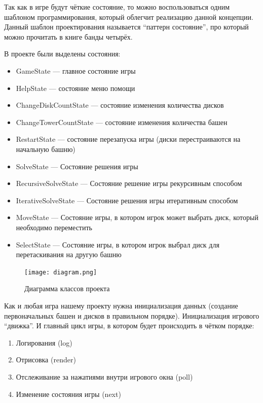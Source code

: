 Так как в игре будут чёткие состояние, то можно воспользоваться одним шаблоном
программирования, который облегчит реализацию данной концепции. Данный шаблон
проектирования называется ``паттерн состояние'', про который можно прочитать в
книге банды четырёх.\cite{book:2584808}

В проекте были выделены состояния:

\begin{itemize}
	\item GameState --- главное состояние игры
	\item HelpState --- состояние меню помощи
	\item ChangeDiskCountState --- состояние изменения количества дисков
	\item ChangeTowerCountState --- состояние изменения количества башен
	\item RestartState --- состояние перезапуска игры (диски перестраиваются на
	      начальную башню)
	\item SolveState --- Состояние решения игры
	\item RecursiveSolveState --- Состояние решение игры рекурсивным способом
	\item IterativeSolveState --- Состояние решения игры итеративным способом
	\item MoveState --- Состояние игры, в котором игрок может выбрать диск,
	      который необходимо переместить
	\item SelectState --- Состояние игры, в котором игрок выбрал диск для
	      перетаскивания на другую башню
\end{itemize}

\begin{figure}[H]
	\begin{center}
		\texttt{[image: diagram.png]}
		\caption{Диаграмма классов проекта}
	\end{center}
\end{figure}

Как и любая игра нашему проекту нужна инициализация данных (создание
первоначальных башен и дисков в правильном порядке). Инициализация игрового
``движка''. И главный цикл игры, в котором будет происходить в чётком порядке:

\begin{enumerate}
	\item Логирования (log)
	\item Отрисовка (render)
	\item Отслеживание за нажатиями внутри игрового окна (poll)
	\item Изменение состояния игры (next)
\end{enumerate}

